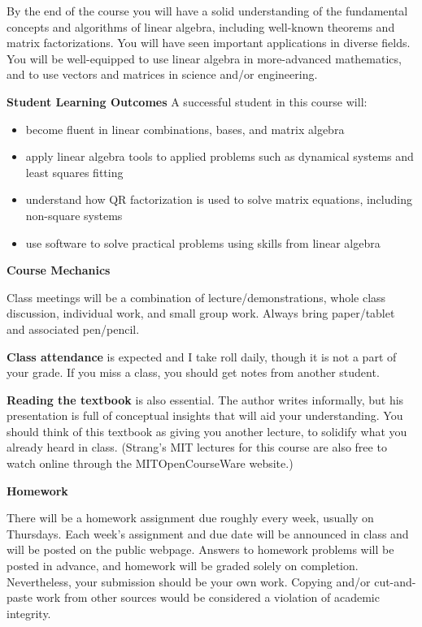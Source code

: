 \documentclass[12pt]{article}
\begin{document}
By the end of the course you will have a solid understanding of the fundamental concepts and algorithms of linear algebra, including well-known theorems and matrix factorizations.  You will have seen important applications in diverse fields. You will be well-equipped to use linear algebra in more-advanced mathematics, and to use vectors and matrices in science and/or engineering.


\textbf{\large{Student Learning Outcomes}} A successful student in this course will:
\begin{itemize}
\item become fluent in linear combinations, bases, and matrix algebra
\item apply linear algebra tools to applied problems such as dynamical systems and least squares fitting
\item understand how QR factorization is used to solve matrix equations, including non-square systems
\item use software to solve practical problems using skills from linear algebra
\end{itemize}
 
 
 \newpage
{\textbf{\large{Course Mechanics}}}

Class meetings will be a combination of lecture/demonstrations, whole class discussion, individual work, and small group work. Always bring paper/tablet and associated pen/pencil. 

 \noindent\textbf{Class attendance} is expected and I
take roll daily, though it is not a part of your grade. If you miss a class, you should get notes from another student. 

 \noindent\textbf{Reading the textbook} is also essential. The author writes informally, but his presentation is full of
conceptual insights that will aid your understanding.  You should think of this textbook as giving you another lecture, to
solidify what you already heard in class. (Strang's MIT lectures for this course are also free to watch online through the MITOpenCourseWare website.)


{\textbf{\large{Homework}}}

There will be a homework assignment due roughly every week, usually on Thursdays. Each week’s assignment and due date will be announced in class and will be posted on the public webpage. Answers to homework problems will be posted in advance, and homework will be graded solely on completion. Nevertheless, your submission should be your own work. Copying and/or cut-and-paste work from other sources would be considered a violation of academic integrity.
\end{document}
